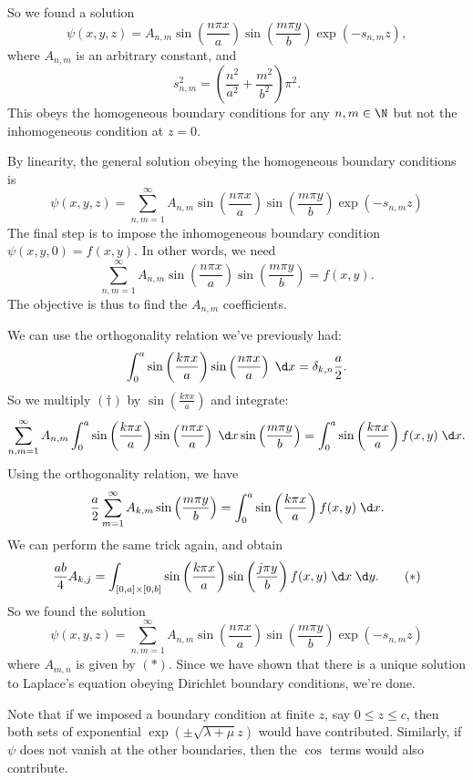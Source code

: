 \documentclass[a4paper]{article}
\begin{document}
So we found a solution
\[
  \psi(x, y, z) = A_{n, m}\sin \left(\frac{n\pi x}{a}\right) \sin \left(\frac{m\pi y}{b}\right) \exp(-s_{n, m} z),
\]
where $A_{n, m}$ is an arbitrary constant, and
\[
  s_{n, m}^2 = \left(\frac{n^2}{a^2} + \frac{m^2}{b^2}\right)\pi^2.
\]
This obeys the homogeneous boundary conditions for any $n, m \in \N$ but not the inhomogeneous condition at $z = 0$.

By linearity, the general solution obeying the homogeneous boundary conditions is
\[
  \psi(x, y, z) = \sum_{n, m = 1}^{\infty} A_{n, m} \sin\left(\frac{n\pi x}{a}\right) \sin \left(\frac{m\pi y}{b}\right) \exp(-s_{n, m} z)
\]
The final step is to impose the inhomogeneous boundary condition $\psi(x, y, 0) = f(x, y)$. In other words, we need
\[
  \sum_{n, m = 1}^{\infty} A_{n, m} \sin\left(\frac{n\pi x}{a}\right) \sin \left(\frac{m\pi y}{b}\right) = f(x, y). \tag{$\dagger$}
\]
The objective is thus to find the $A_{n, m}$ coefficients.

We can use the orthogonality relation we've previously had:
\[
  \int_0^a \sin\left(\frac{k\pi x}{a}\right) \sin \left(\frac{n\pi x}{a}\right)\;\d x = \delta_{k, n} \frac{a}{2}.
\]
So we multiply $(\dagger)$ by $\sin \left(\frac{k\pi x}{a}\right)$ and integrate:
\[
  \sum_{n, m = 1}^\infty A_{n, m}\int_0^a \sin \left(\frac{k\pi x}{a}\right) \sin \left(\frac{n\pi x}{a}\right)\;\d x \sin\left(\frac{m\pi y}{b}\right) = \int_0^a \sin\left(\frac{k \pi x}{a}\right)f(x, y) \;\d x.
\]
Using the orthogonality relation, we have
\[
  \frac{a}{2}\sum_{m = 1}^\infty A_{k, m} \sin\left(\frac{m\pi y}{b}\right) = \int_0^a \sin\left(\frac{k\pi x}{a}\right) f(x, y)\;\d x.
\]
We can perform the same trick again, and obtain
\[
  \frac{ab}{4}A_{k, j} = \int_{[0, a]\times [0, b]}\sin \left(\frac{k\pi x}{a}\right) \sin\left(\frac{j\pi y}{b}\right) f(x, y)\;\d x\;\d y.\tag{$*$}
\]
So we found the solution
\[
  \psi(x, y, z) = \sum_{n, m = 1}^{\infty} A_{n, m} \sin\left(\frac{n\pi x}{a}\right) \sin \left(\frac{m\pi y}{b}\right) \exp(-s_{n, m} z)
\]
where $A_{m, n}$ is given by $(*)$. Since we have shown that there is a unique solution to Laplace's equation obeying Dirichlet boundary conditions, we're done.

Note that if we imposed a boundary condition at finite $z$, say $0 \leq z \leq c$, then both sets of exponential $\exp (\pm \sqrt{\lambda + \mu} z)$ would have contributed. Similarly, if $\psi$ does not vanish at the other boundaries, then the $\cos$ terms would also contribute.
\end{document}
